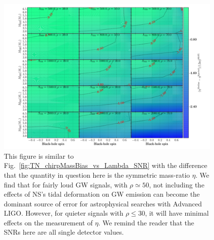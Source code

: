\documentclass[aps,prd,amsmath,floats,floatfix, twocolumn,
superscriptaddress,nofootinbib,showpacs]{revtex4-1}
\begin{document}
\begin{figure}[!t]
\centering    
\includegraphics[trim={1.3cm 0 0 0},width=2.\columnwidth]{plots/TNEtaBiasesOverCIWidths_CI90_0_Lambda_SNR30_70_linear002}
\caption{This figure is similar to Fig.~\ref{fig:TN_chirpMassBias_vs_Lambda_SNR}
with the difference that the quantity in question here is the symmetric 
mass-ratio $\eta$. We find that for fairly loud GW signals, with $\rho\simeq 50$,
not including the effects of NS's tidal deformation on GW emission can become the dominant
source of error for astrophysical searches with Advanced LIGO. However,
for quieter signals with $\rho\leq 30$, it will have minimal effects on the measurement
of $\eta$. We remind the reader that the SNRs here are all single detector values.
}
\label{fig:TN_EtaBias_vs_Lambda_SNR}
\end{figure}
% 
% 
\end{document}
